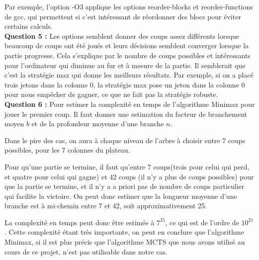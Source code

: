 \documentclass[a4paper, 11pt]{article}
\begin{document}
Par exemple, l'option -O3 applique les options reorder-blocks et reorder-functions de gcc, qui permettent si c'est intéressant de réordonner des blocs pour éviter certains calculs.\\

\textbf{Question 5 : } Les options semblent donner des coups assez différents lorsque beaucoup de coups ont été joués et leurs décisions semblent converger lorsque la partie progresse. Cela s'explique par le nombre de coups possibles et intéressants pour l'ordinateur qui diminue au fur et à mesure de la partie. Il semblerait que c'est la stratégie max qui donne les meilleurs résultats. Par exemple, si on a placé trois jetons dans la colonne 0, la stratégie max pose un jeton dans la colonne 0 pour nous empêcher de gagner, ce que ne fait pas la stratégie robuste.\\


\textbf{Question 6 : } Pour estimer la complexité en temps de l'algorithme Minimax pour jouer le premier coup. Il faut donner une estimation du facteur de branchement moyen $b$ et de la profondeur moyenne d'une branche $n$.

Dans le pire des cas, on aura à chaque niveau de l'arbre à choisir entre 7 coups possibles, pour les 7 colonnes du plateau.

Pour qu'une partie se termine, il faut qu'entre 7 coups(trois pour celui qui perd, et quatre pour celui qui gagne) et 42 coups (il n'y a plus de coups possibles) pour que la partie se termine, et il n'y a a priori pas de nombre de coups particulier qui facilite la victoire. On peut donc estimer que la longueur moyenne d'une branche est à mi-chemin entre 7 et 42, soit approximativement 25.

La complexité en temps peut donc être estimée à $7^{25}$, ce qui est de l'ordre de $10^{21}$. Cette complexité étant très importante, on peut en conclure que l'algorithme Minimax, si il est plus précis que l'algorithme MCTS que nous avons utilisé au cours de ce projet, n'est pas utilisable dans notre cas.
\end{document}
